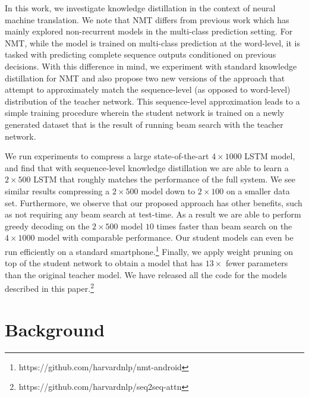 \documentclass[11pt,letterpaper]{article}
\begin{document}
In this work, we investigate knowledge distillation  in the context of
neural machine translation. We note that NMT differs
from previous work which has mainly explored non-recurrent
models in the multi-class prediction setting. For NMT,
while the model is trained on multi-class prediction at the word-level, it is tasked
with predicting complete sequence outputs conditioned on previous
decisions. With this difference in mind, we experiment with standard knowledge
distillation for NMT and also propose two new versions of the approach
that attempt to approximately match the sequence-level (as opposed to word-level)
distribution of the teacher network. This
sequence-level approximation leads to a simple training procedure wherein the student
network is trained on a newly generated dataset that is the result of running beam search 
with the teacher network.

We run experiments to compress a large
state-of-the-art $4\times1000$ LSTM model, and find that with sequence-level knowledge 
distillation we are
able to learn a $2\times500$ LSTM that roughly matches the performance
of the full system. We see similar results
compressing a $2\times 500$ model down to $2\times 100$ on a smaller
data set.  Furthermore, we observe that  our proposed approach has other
benefits, such as not requiring any beam search at test-time. As a
result we are able to perform greedy decoding on the $2\times500$
model $10$ times faster than beam search on the $4\times1000$ model
with comparable performance. Our student models can even be run
efficiently on a standard smartphone.\footnote{https://github.com/harvardnlp/nmt-android}
Finally, we apply weight pruning on top of the student network to obtain a model that has 
$13\times$ fewer parameters than the original teacher model.
 We have released all the code for the models 
described in this paper.\footnote{https://github.com/harvardnlp/seq2seq-attn}


\section{Background}
\end{document}
